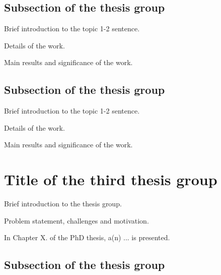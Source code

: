 \documentclass[12pt,a4paper]{extarticle}
\begin{document}
\subsection{Subsection of the thesis group}


Brief introduction to the topic 1-2 sentence.

Details of the work.

Main results and significance of the work.

\subsection{Subsection of the thesis group}


Brief introduction to the topic 1-2 sentence.

Details of the work.

Main results and significance of the work.

\section{Title of the third thesis group}

Brief introduction to the thesis group.

Problem statement, challenges and motivation.

In Chapter X. of the PhD thesis, a(n) ... is presented.

\subsection{Subsection of the thesis group}

\end{document}
